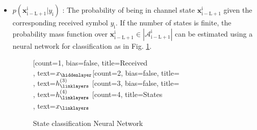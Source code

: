 \documentclass[12pt,a4paper]{article}
\begin{document}
\begin{itemize}
\item $p(\mathbf{x}_{\mathrm{i-L+1}}^{\mathrm{i}}|y_{\mathrm{i}})$
: The probability of being in channel state $\mathbf{x}_{\mathrm{i-L+1}}^{\mathrm{i}}$ given the corresponding received symbol $y_{\mathrm{i}}$. If the number of states is finite, the probability mass function over $\mathbf{x}_{\mathrm{i-L+1}}^{\mathrm{i}} \in
|\mathcal{A}_{\mathrm{i-L+1}}^{\mathrm{i}}|$ can be estimated using a neural network for classification as in Fig. \ref{nn}. 
	\begin{figure}[H]\label{nn}
	\centering
		\begin{neuralnetwork}[height=4, nodespacing=10mm, layerspacing=15mm]
		\newcommand{\x}[2]{$x_#2$}
		\newcommand{\y}[2]{$\hat{y}_#2$}
		\newcommand{\hfirst}[2]{\small $h^{(1)}_#2$}
		\newcommand{\hsecond}[2]{\small $h^{(2)}_#2$}
		\newcommand{\hthird}[2]{\small $h^{(3)}_#2$}
		\newcommand{\hfourth}[2]{\small $h^{(4)}_#2$}
		[count=1, bias=false, title=Received\\, text=\x]
		\hiddenlayer[count=2, bias=false, title=\\, text=\hthird] \linklayers
		\hiddenlayer[count=3, bias=false, title=\\, text=\hfourth] \linklayers
		\outputlayer[count=4, title=States\\, text=\x] \linklayers
	    \end{neuralnetwork}
	    	  	  \caption{State classification Neural Network}

	\end{figure}


\end{itemize}
\end{document}
